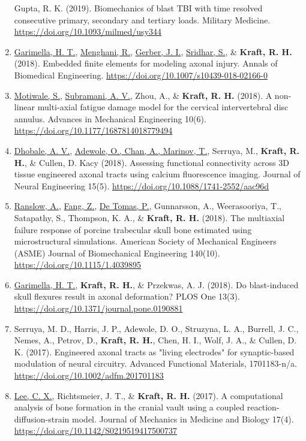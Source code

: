 \documentclass[a4paper,10pt]{article}
\begin{document}
\begin{enumerate}
 Gupta, R. K. (2019). Biomechanics of blast TBI with time resolved consecutive primary, secondary and tertiary loads. Military Medicine. \url{https://doi.org/10.1093/milmed/usy344}
  \item	\underline{Garimella, H. T.}, \underline{Menghani, R.}, \underline{Gerber, J. I.}, \underline{Sridhar, S.}, \&
 \textbf{\textbf{Kraft,} R. H.} (2018). Embedded finite elements for modeling axonal injury. Annals of Biomedical Engineering. \url{https://doi.org/10.1007/s10439-018-02166-0}
  \item	\underline{Motiwale, S.}, \underline{Subramani, A. V.}, Zhou, A., \&
 \textbf{\textbf{Kraft,} R. H.} (2018). A non-linear multi-axial fatigue damage model for the cervical intervertebral disc annulus. Advances in Mechanical Engineering 10(6). \url{https://doi.org/10.1177/1687814018779494}
  \item	\underline{Dhobale, A. V.}, \underline{Adewole, O., Chan, A., Marinov, T.}, Serruya, M., \textbf{\textbf{Kraft,} R. H.}, \&
 Cullen, D. Kacy (2018). Assessing functional connectivity across 3D tissue engineered axonal tracts using calcium fluorescence imaging. Journal of Neural Engineering 15(5). \url{https://doi.org/10.1088/1741-2552/aac96d}
  \item	\underline{Ranslow, A.}, \underline{Fang, Z.}, \underline{De Tomas, P.}, Gunnarsson, A., Weerasooriya, T., Satapathy, S., Thompson, K. A., \&
 \textbf{\textbf{Kraft,} R. H.} (2018). The multiaxial failure response of porcine trabecular skull bone estimated using microstructural simulations. American Society of Mechanical Engineers (ASME) Journal of Biomechanical Engineering 140(10). \url{https://doi.org/10.1115/1.4039895}
  \item	\underline{Garimella, H. T.}, \textbf{\textbf{Kraft,} R. H.}, \&
 Przekwas, A. J. (2018). Do blast-induced skull flexures result in axonal deformation? PLOS One 13(3). \url{https://doi.org/10.1371/journal.pone.0190881}
  \item	Serruya, M. D., Harris, J. P., Adewole, D. O., Struzyna, L. A., Burrell, J. C., Nemes, A., Petrov, D., \textbf{\textbf{Kraft,} R. H.}, Chen, H. I., Wolf, J. A., \&
 Cullen, D. K. (2017). Engineered axonal tracts as    "living electrodes" for synaptic-based modulation of neural circuitry. Advanced Functional Materials, 1701183-n/a. \url{https://doi.org/10.1002/adfm.201701183}
  \item	\underline{Lee, C. X.}, Richtsmeier, J. T., \&
 \textbf{\textbf{Kraft,} R. H.} (2017). A computational analysis of bone formation in the cranial vault using a coupled reaction-diffusion-strain model. Journal of Mechanics in Medicine and Biology 17(4). \url{https://doi.org/10.1142/S0219519417500737}

\end{enumerate}
\end{document}
